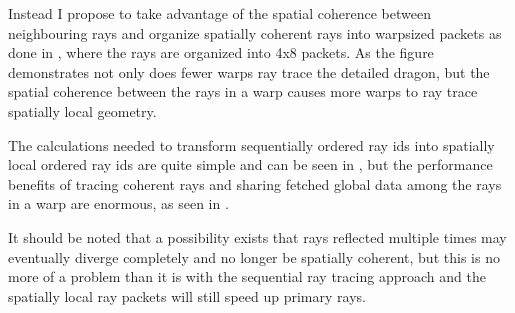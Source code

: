 Instead I propose to take advantage of the spatial coherence between
neighbouring rays and organize spatially coherent rays into warpsized packets as
done in , where the rays are organized into 4x8
packets. As the figure demonstrates not only does fewer warps ray trace the
detailed dragon, but the spatial coherence between the rays in a warp causes
more warps to ray trace spatially local geometry.

\begin{figure}
  \hspace{20pt}
  \caption[Sequantial and spatially coherent rays per warp.]{}
\end{figure}

The calculations needed to transform sequentially ordered ray ids into spatially
local ordered ray ids are quite simple and can be seen in ,
but the performance benefits of tracing coherent rays and sharing fetched global
data among the rays in a warp are enormous, as seen in
.

It should be noted that a possibility exists that rays reflected multiple times
may eventually diverge completely and no longer be spatially coherent, but this
is no more of a problem than it is with the sequential ray tracing approach and
the spatially local ray packets will still speed up primary rays.


